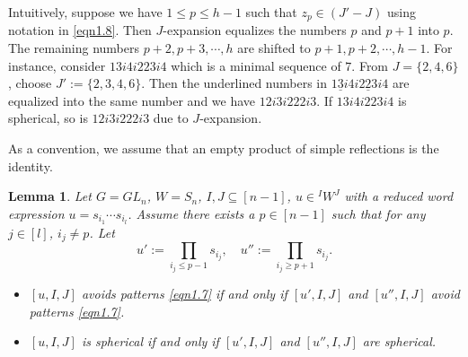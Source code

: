 \documentclass[12pt]{amsart}
\newtheorem{lemma}[theorem]{Lemma}
\theoremstyle{definition}
\theoremstyle{remark}
\begin{document}
Intuitively, suppose we have $1 \leq p \leq h-1$ such that $z_p \in (J' - J)$ using notation in \eqref{eqn1.8}. Then $J$-expansion equalizes the numbers $p$ and $p+1$ into $p$. The remaining numbers $p+2, p+3 , \cdots , h$ are shifted to $p+1 , p+2 , \cdots , h-1$. For instance, consider $13i4i223i4$ which is a minimal sequence of $7$. From $J = \{2,4,6\}$, choose $J' := \{2,3,4,6 \}$. Then the underlined numbers in $1\underline{3}i4i\underline{223}i4$ are equalized into the same number and we have $12i3i222i3$. If $13i4i223i4$ is spherical, so is $12i3i222i3$ due to $J$-expansion.

As a convention, we assume that an empty product of simple reflections is the identity.

\begin{lemma}\label{lem3.3}
Let $G= GL_n$, $W= S_n$, $I , J \subseteq [n-1]$, $u \in {}^I W^J$ with a reduced word expression $u = s_{i_1} \cdots s_{i_l}$. Assume there exists a $p \in [n-1]$ such that for any $j \in [l]$, $i_j \neq  p$. Let
\begin{equation}
u' := \prod_{i_j \leq p-1}s_{i_j} ,  \quad u'' := \prod_{i_j \geq p+1} s_{i_j}.
\end{equation}
\begin{itemize}
\item[(a)] $[u,I,J]$ avoids patterns \eqref{eqn1.7} if and only if $[u',I,J]$ and $[u'',I,J]$ avoid patterns \eqref{eqn1.7}.
\item[(b)] $[u,I,J]$ is spherical if and only if $[u' , I, J]$ and $[u'',I,J]$ are spherical.
\end{itemize}
\end{lemma}
\end{document}
